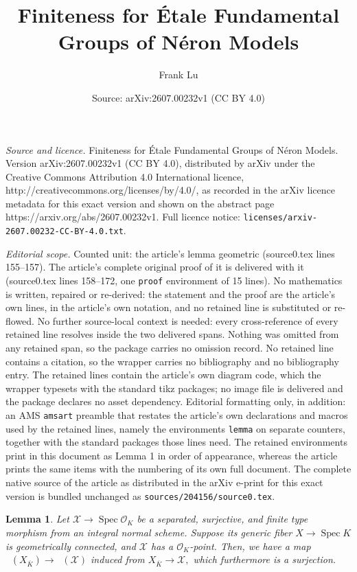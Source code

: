\documentclass[10pt,a4paper]{amsart}
\title{Finiteness for \'{E}tale Fundamental Groups of N\'{e}ron Models}
\author{Frank Lu}
\date{Source: arXiv:2607.00232v1 (CC BY 4.0)}
\newtheorem{lemma}{Lemma}
\DeclareMathOperator{\Spec}{Spec}
\DeclareMathOperator{\et}{et}
\DeclareMathOperator{\geom}{geom}
\DeclareMathOperator{\piet}{\pi_1^{\et}}
\DeclareMathOperator{\pietgeo}{\pi_1^{\et, \geom}}
\begin{document}
\maketitle

\noindent\emph{Source and licence.} Finiteness for \'{E}tale Fundamental Groups of N\'{e}ron Models. Version arXiv:2607.00232v1 (CC BY 4.0), distributed by arXiv under the Creative Commons Attribution 4.0 International licence, http://creativecommons.org/licenses/by/4.0/, as recorded in the arXiv licence metadata for this exact version and shown on the abstract page https://arxiv.org/abs/2607.00232v1. Full licence notice: \texttt{licenses/arxiv-2607.00232-CC-BY-4.0.txt}.\par\smallskip

\noindent\textit{Editorial scope.} Counted unit: the article's lemma geometric (source0.tex lines 155--157). The article's complete original proof of it is delivered with it (source0.tex lines 158--172, one \texttt{proof} environment of 15 lines). No mathematics is written, repaired or re-derived: the statement and the proof are the article's own lines, in the article's own notation, and no retained line is substituted or re-flowed.  No further source-local context is needed: every cross-reference of every retained line resolves inside the two delivered spans.  Nothing was omitted from any retained span, so the package carries no omission record.  No retained line contains a citation, so the wrapper carries no bibliography and no bibliography entry.  The retained lines contain the article's own diagram code, which the wrapper typesets with the standard tikz packages; no image file is delivered and the package declares no asset dependency.  Editorial formatting only, in addition: an AMS \texttt{amsart} preamble that restates the article's own declarations and macros used by the retained lines, namely the environments \texttt{lemma} on separate counters, together with the standard packages those lines need.  The retained environments print in this document as Lemma 1 in order of appearance, whereas the article prints the same items with the numbering of its own full document.  The complete native source of the article as distributed in the arXiv e-print for this exact version is bundled unchanged as \texttt{sources/204156/source0.tex}.
\begin{lemma}\label{lem: generic surjects onto integral for geometric}
Let $\mathcal{X} \rightarrow \Spec \mathcal{O}_K$ be a separated, surjective, and finite type morphism from an integral normal scheme. Suppose its generic fiber $X \rightarrow \Spec K$ is geometrically connected, and $\mathcal{X}$ has a $\mathcal{O}_K$-point. Then, we have a map $\piet(X_{\overline{K}}) \rightarrow \pietgeo(\mathcal{X})$ induced from $X_{\overline{K}} \rightarrow \mathcal{X},$ which furthermore is a surjection.
\end{lemma}
\end{document}
